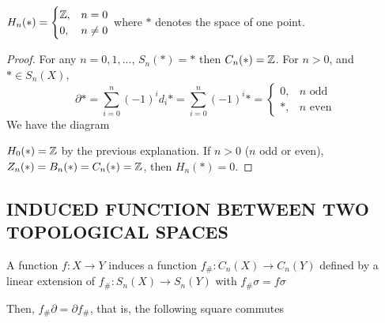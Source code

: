 \documentclass{report}
\begin{document}
\begin{proposition}
    $H_n(*) = \begin{cases}
        \mathbb{Z}, &n = 0 \\
        0, &n \neq 0
    \end{cases}$
    where $*$ denotes the space of one point.
\end{proposition}

\begin{proof}
    For any $n = 0, 1, ...$, $S_n(*) = *$ then $C_n(*) = \mathbb{Z}$. For $n > 0$, and $* \in S_n(X)$, 
    $$
        \partial * = \sum_{i=0}^n (-1)^i d_i * = \sum_{i=0}^n (-1)^i * = \begin{cases}
            0, &\text{$n$ odd} \\
            *, &\text{$n$ even}
        \end{cases}
    $$
    We have the diagram

    \begin{center}
    \end{center}

$H_0(*) = \mathbb{Z}$ by the previous explanation. If $n > 0$ ($n$ odd or even), $Z_n(*) = B_n(*) = C_n(*) = \mathbb{Z}$, then $H_n(*) = 0$.

\end{proof}

\subsection{INDUCED FUNCTION BETWEEN TWO TOPOLOGICAL SPACES}

\begin{proposition}
    A function $f: X \to Y$ induces a function $f_\#: C_n(X) \to C_n(Y)$ defined by a linear extension of $f_\#: S_n(X) \to S_n(Y)$ with $f_\# \sigma = f \sigma$
    \begin{center}
    \end{center}
    Then, $f_\# \partial = \partial f_\#$, that is, the following square commutes    
    \begin{center}
    \end{center}
\end{proposition}
\end{document}

